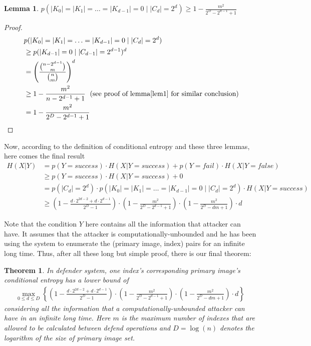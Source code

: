 \documentclass[10pt,a4paper]{article}
\newtheorem{mylemma}{Lemma}
\newtheorem{mytheorem}{Theorem}
\begin{document}
		\begin{mylemma}
			$p(|K_0| = |K_1| = \ldots = |K_{d-1}| = 0 \; | \; |C_d| = 2^d) 
				\geq 1-\frac{m^2}{2^D-2^{d-1}+1}$
		\end{mylemma}
		
		\begin{proof}
			\begin{align*}
				&p(|K_0| = |K_1| = \ldots = |K_{d-1}| = 0 \; | \; |C_d| = 2^d) \\\
					&\geq p(|K_{d-1}| = 0 \; | \; |C_{d-1}| = 2^{d-1})^d\\
					&= \left(\frac{\binom{n-2^{d-1}}{m}}{\binom{n}{m}} \right)^d\\
					&\geq 1-\frac{m^2}{n-2^{d-1}+1}	\; \text{ (see proof of lemma\ref{lem1} for similar conclusion})\\
					&= 1-\frac{m^2}{2^D-2^{d-1}+1}
			\end{align*}
		\end{proof}
		
		Now, according to the definition of conditional entropy
		and these three lemmas, here comes the final result
		\begin{align*}
			H(X | Y) &= p(Y = success) \cdot H(X | Y = success)
				+ p(Y = fail) \cdot H(X | Y = false)\\
				&\geq p(Y = success) \cdot H(X | Y = success)+0\\
				&= p(|C_d| = 2^d) \cdot p(|K_0| = |K_1| = \ldots = |K_{d-1}| = 0 
					\; | \; |C_d| = 2^d) \cdot H(X | Y = success)\\
				&\geq (1-\frac{d \cdot 2^{2d-2}+d \cdot 2^{d-1}}{2^D-1})
					\cdot (1-\frac{m^2}{2^D-2^{d-1}+1}) 
					\cdot (1-\frac{m^2}{2^D-dm+1}) \cdot d 
		\end{align*}
		
		Note that the condition $Y$ here contains all the
		information that attacker can have. It assumes that
		the attacker is computationally-unbounded and he has
		been using the system to enumerate the (primary image, index) pairs
		for an infinite long time. Thus, after all these long but simple
		proof, there is our final theorem:
		\begin{mytheorem}\label{thm1}
			In defender system, one index's corresponding
			primary image's conditional entropy has a lower bound of
			\begin{align*}
				\max_{0 \leq d \leq D} \left\{ (1-\frac{d \cdot 2^{2d-2}+d \cdot 2^{d-1}}{2^D-1})
					\cdot (1-\frac{m^2}{2^D-2^{d-1}+1}) 
					\cdot (1-\frac{m^2}{2^D-dm+1}) \cdot d \right\}
			\end{align*}
			considering all the information
			that a computationally-unbounded attacker can
			have in an infinite long time. Here $m$ is
			the maximum number of indexes that are allowed to be calculated
			between defend operations and $D = \log(n)$ denotes the
			logarithm of the size of primary image set.
		\end{mytheorem}
		
\end{document}

